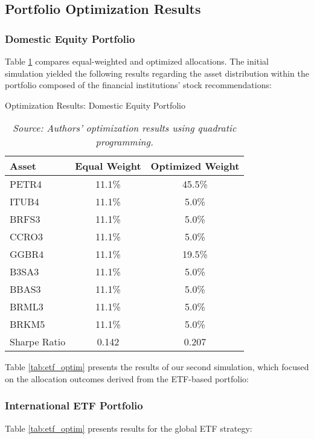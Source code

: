 \documentclass{article}
\begin{document}
\subsection{Portfolio Optimization Results}

\subsubsection{Domestic Equity Portfolio}
Table \ref{tab:equity_optim} compares equal-weighted and optimized allocations. The initial simulation yielded the following results regarding the asset distribution within the portfolio composed of the financial institutions' stock recommendations:

\begin{table}[htbp]
\centering
\caption{Optimization Results: Domestic Equity Portfolio}
\label{tab:equity_optim}
\begin{tabular}{lcc}
\toprule
Asset & Equal Weight & Optimized Weight \\
\midrule
PETR4 & 11.1\% & 45.5\% \\
ITUB4 & 11.1\% & 5.0\% \\
BRFS3 & 11.1\% & 5.0\% \\
CCRO3 & 11.1\% & 5.0\% \\
GGBR4 & 11.1\% & 19.5\% \\
B3SA3 & 11.1\% & 5.0\% \\
BBAS3 & 11.1\% & 5.0\% \\
BRML3 & 11.1\% & 5.0\% \\
BRKM5 & 11.1\% & 5.0\% \\
\midrule
Sharpe Ratio & 0.142 & 0.207 \\
\bottomrule
\end{tabular}

\vspace{0.4cm}
\caption*{\textit{Source: Authors' optimization results using quadratic programming.}}
\end{table}

Table \ref{tab:etf_optim} presents the results of our second simulation, which focused on the allocation outcomes derived from the ETF-based portfolio:

\subsubsection{International ETF Portfolio}
Table \ref{tab:etf_optim} presents results for the global ETF strategy:
\end{document}
